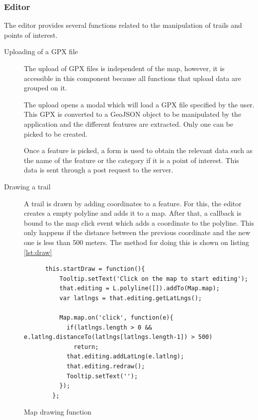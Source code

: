 \subsubsection*{Editor}

The editor provides several functions related to the manipulation of trails and points of interest.

\begin{description}
\item[Uploading of a GPX file] The upload of GPX files is independent of the map, however, it is accessible in this component because all functions that upload data are grouped on it.

The upload opens a modal which will load a GPX file specified by the user. This GPX is converted to a GeoJSON object to be manipulated by the application and the different features are extracted. Only one can be picked to be created.

Once a feature is picked, a form is used to obtain the relevant data such as the name of the feature or the category if it is a point of interest. This data is sent through a post request to the server.

\item[Drawing a trail] A trail is drawn by adding coordinates to a feature. For this, the editor creates a empty polyline and adds it to a map. After that, a callback is bound to the map click event which adds a coordinate to the polyline. This only happens if the distance between the previous coordinate and the new one is less than 500 meters. The method for doing this is shown on listing \ref{lst:draw}

\begin{listing}[ht]\centering
  \begin{minipage}{.85\textwidth}
    \begin{verbatim}
      this.startDraw = function(){
          Tooltip.setText('Click on the map to start editing');
          that.editing = L.polyline([]).addTo(Map.map);
          var latlngs = that.editing.getLatLngs();
      
          Map.map.on('click', function(e){
            if(latlngs.length > 0 && e.latlng.distanceTo(latlngs[latlngs.length-1]) > 500) 
              return;
            that.editing.addLatLng(e.latlng);
            that.editing.redraw();
            Tooltip.setText('');
          });
        };
    \end{verbatim}
  \end{minipage}
  \caption{Map drawing function}\label{lst:draw}
\end{listing}


\end{description}
